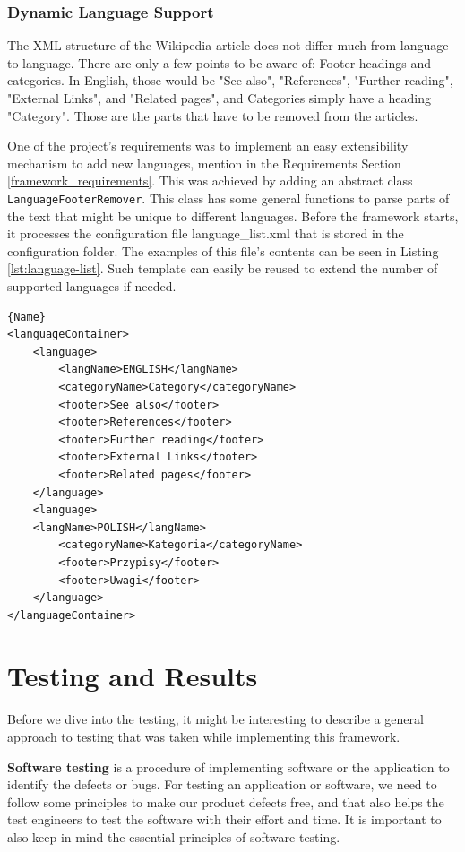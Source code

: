 \documentclass[thesis=M,english,hidelinks]{FITthesis}[2019/12/23]
\begin{document}
\subsection{Dynamic Language Support}\label{dynamic_lang_support}

The XML-structure of the Wikipedia article does not differ much from language to language. There are only a few points to be aware of: Footer headings and categories. In English, those would be "See also", "References", "Further reading", "External Links", and "Related pages", and Categories simply have a heading "Category". Those are the parts that have to be removed from the articles.

One of the project's requirements was to implement an easy extensibility mechanism to add new languages, mention in the Requirements Section \ref{framework_requirements}. This was achieved by adding an abstract class \lstinline{LanguageFooterRemover}. This class has some general functions to parse parts of the text that might be unique to different languages. Before the framework starts, it processes the configuration file language\_list.xml that is stored in the configuration folder. The examples of this file's contents can be seen in Listing \ref{lst:language-list}. Such template can easily be reused to extend the number of supported languages if needed.

\begin{lstlisting}[caption=Example of an language configuration file,frame=tlrb,  label = {lst:language-list}]{Name}
<languageContainer>
	<language>
		<langName>ENGLISH</langName>
		<categoryName>Category</categoryName>
		<footer>See also</footer>
		<footer>References</footer>
		<footer>Further reading</footer>
		<footer>External Links</footer>
		<footer>Related pages</footer>
	</language>
	<language>
	<langName>POLISH</langName>
		<categoryName>Kategoria</categoryName>
		<footer>Przypisy</footer>
		<footer>Uwagi</footer>
	</language>
</languageContainer>
\end{lstlisting}

\chapter{Testing and Results}

Before we dive into the testing, it might be interesting to describe a general approach to testing that was taken while implementing this framework.

\textbf{Software testing} is a procedure of implementing software or the application to identify the defects or bugs. For testing an application or software, we need to follow some principles to make our product defects free, and that also helps the test engineers to test the software with their effort and time. It is important to also keep in mind the essential principles of software testing.
\end{document}
